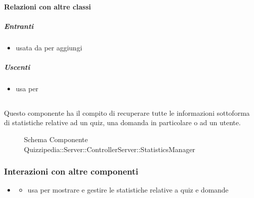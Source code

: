 \paragraph{Relazioni con altre classi}
\subparagraph{Entranti}
\begin{itemize}
\item usata da  per aggiungi
\end{itemize}
\subparagraph{Uscenti}
\begin{itemize}
\item usa  per 
\end{itemize}
\subsection{}
Questo componente ha il compito di recuperare tutte le informazioni sottoforma di statistiche relative ad un quiz, una domanda in particolare o ad un utente.
\begin{figure}[H]
\centering
\noindent{}
\caption[Schema Componente Quizzipedia::Server::ControllerServer::StatisticsManager]{Schema Componente Quizzipedia::Server::ControllerServer::StatisticsManager}
\end{figure}
\subsubsection{Interazioni con altre componenti}
\begin{itemize}
\item {}
\begin{itemize}
\item usa  per mostrare e gestire le statistiche relative a quiz e domande
\end{itemize}
\end{itemize}
